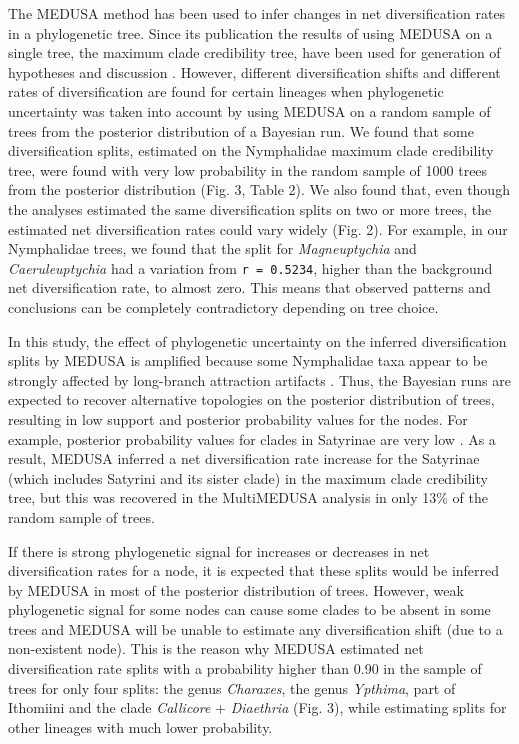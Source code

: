 \documentclass[10pt]{article}
\begin{document}
The MEDUSA method has been used to infer changes in net diversification
rates in a phylogenetic tree. Since its publication \cite{alfaro2009} the results
of using MEDUSA on a single tree, the maximum clade credibility tree,
have been used for generation of hypotheses and discussion
\cite{heikkila2012, litman2011, ryberg2012}. However, different diversification shifts and different
rates of diversification are found for certain lineages when
phylogenetic uncertainty was taken into account by using MEDUSA on a
random sample of trees from the posterior distribution of a Bayesian
run. We found that some diversification splits, estimated on the
Nymphalidae maximum clade credibility tree, were found with very low
probability in the random sample of 1000 trees from the posterior
distribution (Fig. 3, Table 2). We also found that, even though the
analyses estimated the same diversification splits on two or more trees,
the estimated net diversification rates could vary widely (Fig. 2). For
example, in our Nymphalidae trees, we found that the split for
\emph{Magneuptychia} and \emph{Caeruleuptychia} had a variation from
\texttt{r = 0.5234}, higher than the background net diversification
rate, to almost zero. This means that observed patterns and conclusions
can be completely contradictory depending on tree choice.

In this study, the effect of phylogenetic uncertainty on the inferred
diversification splits by MEDUSA is amplified because some Nymphalidae
taxa appear to be strongly affected by long-branch attraction artifacts
\cite{pena2011}. Thus, the Bayesian runs are expected to recover alternative
topologies on the posterior distribution of trees, resulting in low
support and posterior probability values for the nodes. For example,
posterior probability values for clades in Satyrinae are very low
\cite{wahlberg2009}. As a result, MEDUSA inferred a net diversification rate
increase for the Satyrinae (which includes Satyrini and its sister
clade) in the maximum clade credibility tree, but this was recovered in
the MultiMEDUSA analysis in only 13\% of the random sample of trees.

If there is strong phylogenetic signal for increases or decreases in net
diversification rates for a node, it is expected that these splits would
be inferred by MEDUSA in most of the posterior distribution of trees.
However, weak phylogenetic signal for some nodes can cause some clades
to be absent in some trees and MEDUSA will be unable to estimate any
diversification shift (due to a non-existent node). This is the reason
why MEDUSA estimated net diversification rate splits with a probability
higher than 0.90 in the sample of trees for only four splits: the genus
\emph{Charaxes}, the genus \emph{Ypthima}, part of Ithomiini and the
clade \emph{Callicore} + \emph{Diaethria} (Fig. 3), while estimating
splits for other lineages with much lower probability.
\end{document}
